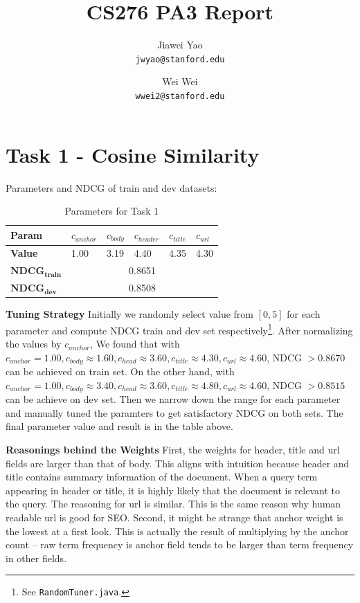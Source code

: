 \documentclass{article}
\begin{document}
\title{CS276 PA3 Report}

\author{
  Jiawei Yao\\
  \texttt{jwyao@stanford.edu}
  \and
  Wei Wei\\
  \texttt{wwei2@stanford.edu}
}

\maketitle

\section{Task 1 - Cosine Similarity}

Parameters and NDCG of train and dev datasets:

\begin{table}[!htb]
    \centering
    \begin{tabular}{ | l | l | l | l | l | l |}
    \hline
    \textbf{Param} & $c_{anchor}$ & $c_{body}$ & $c_{header}$ & $c_{title}$ & $c_{url}$ \\
    \hline
    \textbf{Value} & 1.00 & 3.19 & 4.40 & 4.35 & 4.30 \\
    \hline
    $\mathbf{NDCG_{train}}$ & \multicolumn{5}{c|}{0.8651} \\
    \hline
    $\mathbf{NDCG_{dev}}$ & \multicolumn{5}{c|}{0.8508} \\
    \hline
    \end{tabular}
    \caption{Parameters for Task 1}
\end{table}

\textbf{Tuning Strategy} Initially we randomly select value from $[0,5]$ for each parameter and compute NDCG train and dev set respectively\footnote{See \texttt{RandomTuner.java}.}. After normalizing the values by $c_{anchor}$, We found that with $c_{anchor}= 1.00, c_{body}\approx 1.60, c_{head}\approx 3.60, c_{title}\approx4.30, c_{url}\approx4.60$, NDCG $> 0.8670$ can be achieved on train set. On the other hand, with $c_{anchor}= 1.00, c_{body}\approx 3.40, c_{head}\approx 3.60, c_{title}\approx4.80, c_{url}\approx4.60$, NDCG $> 0.8515$ can be achieve on dev set. Then we narrow down the range for each parameter and manually tuned the paramters to get satisfactory NDCG on both sets. The final parameter value and result is in the table above.

\textbf{Reasonings behind the Weights} First, the weights for header, title and url fields are larger than that of body. This aligns with intuition because header and title contains summary information of the document. When a query term appearing in header or title, it is highly likely that the document is relevant to the query. The reasoning for url is similar. This is the same reason why human readable url is good for SEO. Second, it might be strange that anchor weight is the lowest at a first look. This is actually the result of multiplying by the anchor count -- raw term frequency is anchor field tends to be larger than term frequency in other fields.
\end{document}
